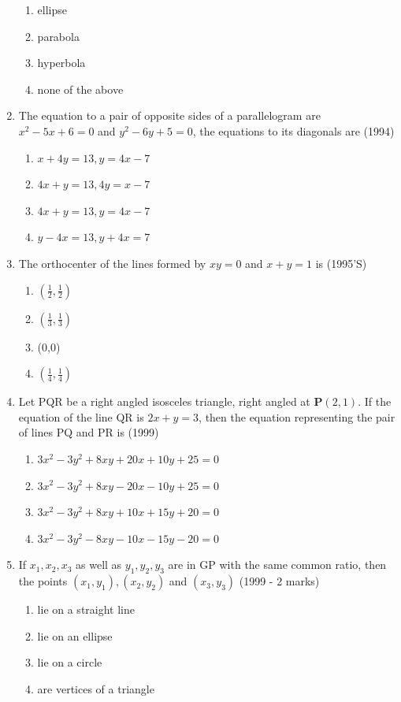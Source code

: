 \documentclass[12pt]{article}
\providecommand{\brak}[1]{\ensuremath{\left(#1\right)}}
\let\vec\mathbf
\begin{document}
\begin{enumerate}
\begin{enumerate}
\item ellipse 
\item parabola  
\item hyperbola  
\item none of the above
\end{enumerate}
\item The equation to a pair of  opposite sides of a parallelogram are $x^2-5x+6=0$ and $y^2-6y+5=0$, the equations to its diagonals are (1994)
\begin{enumerate}
\item $x+4y=13, y=4x-7$  
\item $4x+y=13, 4y=x-7$ 
\item $4x+y=13, y=4x-7$
\item $y-4x=13,y+4x=7$ 
\end{enumerate}
\item The orthocenter of the lines formed by $xy=0$ and $x+y=1$ is (1995'S)
\begin{enumerate}
\item $\brak{\frac{1}{2},\frac{1}{2}}$
\item $\brak{\frac{1}{3},\frac{1}{3}}$
\item (0,0)
\item $\brak{\frac{1}{4},\frac{1}{4}}$
\end{enumerate}
\item Let PQR be a right angled isosceles triangle, right angled at $\vec{P}(2,1)$. If the equation of the line QR is $2x+y=3$, then the equation representing the pair of lines PQ and PR is (1999)\\
\begin{enumerate}
\item $3x^2-3y^2+8xy+20x+10y+25=0$
\item $3x^2-3y^2+8xy-20x-10y+25=0$
\item $3x^2-3y^2+8xy+10x+15y+20=0$
\item $3x^2-3y^2-8xy-10x-15y-20=0$
\end{enumerate}
\item If $x_1,x_2,x_3$ as well as $y_1,y_2,y_3 $ are in GP with the same common ratio, then the points $(x_1,y_1),(x_2,y_2)$ and $(x_3,y_3)$ (1999 - 2 marks)\\
\begin{enumerate}
\item lie on a straight line 
\item lie on an ellipse 
\item lie on a circle  
\item are vertices of a triangle 

\end{enumerate}
\end{enumerate}
\end{document}
